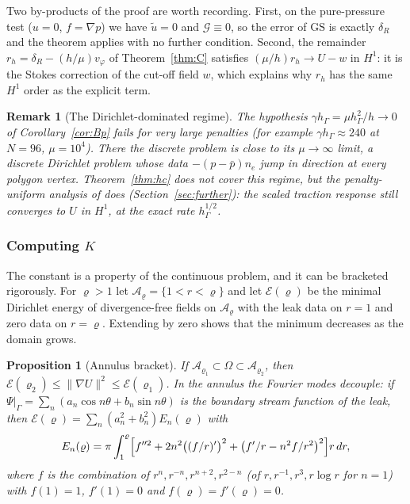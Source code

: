 \documentclass[pdflatex,sn-mathphys-num]{sn-jnl}
\theoremstyle{thmstyleone}
\newtheorem{proposition}[theorem]{Proposition}
\theoremstyle{thmstylethree}
\newtheorem{remark}[theorem]{Remark}
\newcommand{\hG}{h_\Gamma}
\newcommand{\ut}{\tilde u}
\newcommand{\pbar}{\bar p}
\newcommand{\norm}[1]{\lVert #1\rVert}
\newcommand{\GS}{\mathrm{GS}}
\newcommand{\Gc}{\mathcal G}
\begin{document}
Two by-products of the proof are worth recording. First, on the pure-pressure test ($u=0$, $f=\nabla p$) we have $\ut=0$ and $\Gc\equiv0$, so the error of $\GS$ is exactly $\delta_R$ and the theorem applies with no further condition. Second, the remainder $r_h=\delta_R-(h/\mu)v_\varphi$ of Theorem~\ref{thm:C} satisfies $(\mu/h)r_h\to U-w$ in $H^1$: it is the Stokes correction of the cut-off field $w$, which explains why $r_h$ has the same $H^1$ order as the explicit term.

\begin{remark}[The Dirichlet-dominated regime]
The hypothesis $\gamma\hG=\mu\hG^2/h\to0$ of Corollary~\ref{cor:Bp} fails for very large penalties (for example $\gamma\hG\approx240$ at $N=96$, $\mu=10^4$). There the discrete problem is close to its $\mu\to\infty$ limit, a discrete Dirichlet problem whose data $-(p-\pbar)n_e$ jump in direction at every polygon vertex. Theorem~\ref{thm:hc} does not cover this regime, but the penalty-uniform analysis of \cite{PadhiExt} does (Section~\ref{sec:further}): the scaled traction response still converges to $U$ in $H^1$, at the exact rate $\hG^{1/2}$.
\end{remark}

\subsubsection*{Computing $K$}
The constant is a property of the continuous problem, and it can be bracketed rigorously. For $\varrho>1$ let $\mathcal A_\varrho=\{1<r<\varrho\}$ and let $\mathcal E(\varrho)$ be the minimal Dirichlet energy of divergence-free fields on $\mathcal A_\varrho$ with the leak data on $r=1$ and zero data on $r=\varrho$. Extending by zero shows that the minimum decreases as the domain grows.

\begin{proposition}[Annulus bracket]\label{prop:bracket}
If $\mathcal A_{\varrho_1}\subset\Omega\subset\mathcal A_{\varrho_2}$, then $\mathcal E(\varrho_2)\le\norm{\nabla U}^2\le\mathcal E(\varrho_1)$. In the annulus the Fourier modes decouple: if $\Psi|_\Gamma=\sum_n(a_n\cos n\theta+b_n\sin n\theta)$ is the boundary stream function of the leak, then $\mathcal E(\varrho)=\sum_n(a_n^2+b_n^2)E_n(\varrho)$ with
\[
E_n(\varrho)=\pi\int_1^\varrho\Bigl[f''^2+2n^2\bigl((f/r)'\bigr)^2+\bigl(f'/r-n^2f/r^2\bigr)^2\Bigr]r\,dr,
\]
where $f$ is the combination of $r^n,r^{-n},r^{n+2},r^{2-n}$ (of $r,r^{-1},r^3,r\log r$ for $n=1$) with $f(1)=1$, $f'(1)=0$ and $f(\varrho)=f'(\varrho)=0$.
\end{proposition}
\end{document}
